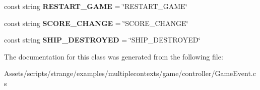 \begin{DoxyCompactItemize}
\item 
\hypertarget{classstrange_1_1examples_1_1multiplecontexts_1_1game_1_1_game_event_afba2f16a972c7dbd87b0086621f14246}{const string {\bfseries R\-E\-S\-T\-A\-R\-T\-\_\-\-G\-A\-M\-E} = \char`\"{}R\-E\-S\-T\-A\-R\-T\-\_\-\-G\-A\-M\-E\char`\"{}}\label{classstrange_1_1examples_1_1multiplecontexts_1_1game_1_1_game_event_afba2f16a972c7dbd87b0086621f14246}

\item 
\hypertarget{classstrange_1_1examples_1_1multiplecontexts_1_1game_1_1_game_event_ad545434fe0148d1bc22db8f35574ca7b}{const string {\bfseries S\-C\-O\-R\-E\-\_\-\-C\-H\-A\-N\-G\-E} = \char`\"{}S\-C\-O\-R\-E\-\_\-\-C\-H\-A\-N\-G\-E\char`\"{}}\label{classstrange_1_1examples_1_1multiplecontexts_1_1game_1_1_game_event_ad545434fe0148d1bc22db8f35574ca7b}

\item 
\hypertarget{classstrange_1_1examples_1_1multiplecontexts_1_1game_1_1_game_event_aaa863148a598ba07cd0ab50b1760b50a}{const string {\bfseries S\-H\-I\-P\-\_\-\-D\-E\-S\-T\-R\-O\-Y\-E\-D} = \char`\"{}S\-H\-I\-P\-\_\-\-D\-E\-S\-T\-R\-O\-Y\-E\-D\char`\"{}}\label{classstrange_1_1examples_1_1multiplecontexts_1_1game_1_1_game_event_aaa863148a598ba07cd0ab50b1760b50a}

\end{DoxyCompactItemize}


The documentation for this class was generated from the following file\-:\begin{DoxyCompactItemize}
\item 
Assets/scripts/strange/examples/multiplecontexts/game/controller/Game\-Event.\-cs\end{DoxyCompactItemize}
